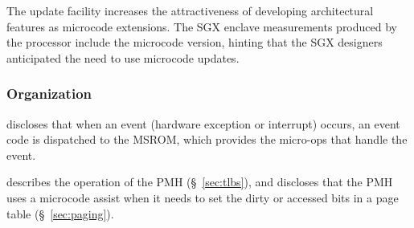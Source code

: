 The update facility increases the attractiveness of developing architectural
features as microcode extensions. The SGX enclave measurements produced by the
processor include the microcode version, hinting that the SGX designers
anticipated the need to use microcode updates.

\subsubsection{Organization}











\cite{intel1999exceptions} discloses that when an event (hardware exception or
interrupt) occurs, an event code is dispatched to the MSROM, which provides the
micro-ops that handle the event.


\cite{intel1997pmh} describes the operation of the PMH (\S~\ref{sec:tlbs}), and
discloses that the PMH uses a microcode assist when it needs to set the dirty
or accessed bits in a page table (\S~\ref{sec:paging}).

